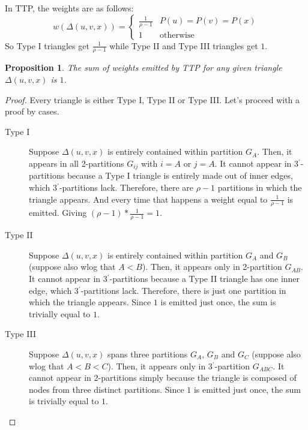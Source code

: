 \documentclass[paper=a4, fontsize=11pt]{scrartcl}
\newtheorem{proposition}{Proposition}
\begin{document}
In TTP, the weights are as follows:
\[
    w(\Delta(u,v,x)) = \begin{cases}
        \frac{1}{\rho-1} & P(u) = P(v) = P(x)  \\
        1 & \text{otherwise}
    \end{cases}
\]
So Type I triangles get $\frac{1}{\rho-1}$ while Type II and Type III triangles
get $1$.

\begin{proposition}
    The sum of weights emitted by TTP for any given triangle $\Delta(u, v, x)$ is $1$.
\end{proposition}
\begin{proof}
    Every triangle is either Type I, Type II or Type III. Let's proceed with a
    proof by cases.
    \begin{description}
        \item[Type I] Suppose $\Delta(u, v, x)$ is entirely contained within
        partition $G_A$. Then, it appears in all 2-partitions $G_{ij}$ with
        $i=A$ or $j=A$. It cannot appear in 3$^\prime$-partitions because a Type
        I triangle is entirely made out of inner edges, which
        3$^\prime$-partitions lack. Therefore, there are $\rho-1$ partitions in
        which the triangle appears. And every time that happens a weight equal
        to $\frac{1}{\rho-1}$ is emitted. Giving $(\rho-1)*\frac{1}{\rho-1}=1$.

        \item[Type II] Suppose $\Delta(u, v, x)$ is entirely contained within
        partition $G_A$ and $G_B$ (suppose also wlog that $A<B$). Then, it
        appears only in 2-partition $G_{AB}$. It cannot appear in
        3$^\prime$-partitions because a Type II triangle has one inner edge,
        which 3$^\prime$-partitions lack. Therefore, there is just one partition
        in which the triangle appears. Since $1$ is emitted just once, the sum
        is trivially equal to $1$.

        \item[Type III] Suppose $\Delta(u, v, x)$ spans three partitions $G_A$,
        $G_B$ and $G_C$ (suppose also wlog that $A<B<C$). Then, it appears only
        in 3$^\prime$-partition $G_{ABC}$. It cannot appear in 2-partitions
        simply because the triangle is composed of nodes from three distinct
        partitions. Since $1$ is emitted just once, the sum is trivially equal
        to $1$.
    \end{description}
\end{proof}
\end{document}
